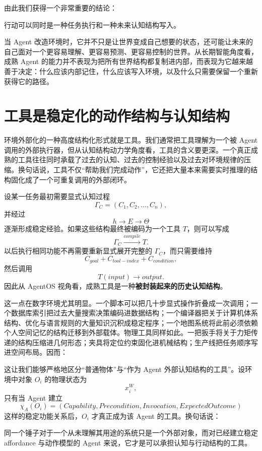 由此我们获得一个非常重要的结论：
\begin{conclusion}
行动可以同时是一种任务执行和一种未来认知结构写入。
\end{conclusion}
当 Agent 改造环境时，它并不只是让世界变成自己想要的状态，还可能让未来的自己面对一个更容易理解、更容易预测、更容易控制的世界。从长期智能角度看，成熟 Agent 的能力并不表现为把所有世界结构都复制进内部，而表现为它越来越善于决定：什么应该内部记住，什么应该写入环境，以及什么只需要保留一个重新获得它的路径。

\section{工具是稳定化的动作结构与认知结构}

环境外部化的一种高度结构化形式就是工具。我们通常把工具理解为一个被 Agent 调用的外部执行器，但从认知结构动力学角度看，工具的含义要更深。一个真正成熟的工具往往同时承载了过去的认知、过去的控制经验以及过去对环境规律的压缩。换句话说，工具不仅``帮助我们完成动作''，它还把大量本来需要实时推理的结构固化成了一个可重复调用的外部闭环。

设某一任务最初需要显式认知过程
\[
\Gamma_C
=
(C_1,C_2,\ldots,C_n),
\]
并经过
\[
h
\rightarrow
E
\rightarrow
\Theta
\]
逐渐形成稳定经验。如果这些结构最终被编码为一个工具 $T$，则可以写成
\[
\Gamma_C
\xrightarrow{compile}
T.
\]
以后执行相同功能不再需要重新显式展开完整的 $\Gamma_C$，而只需要维持
\[
C_{goal}
+
C_{tool-index}
+
C_{condition},
\]
然后调用
\[
T(input)\rightarrow output.
\]
因此从 AgentOS 视角看，成熟工具是一种\textbf{被封装起来的历史认知结构}。

这一点在数字环境尤其明显。一个脚本可以把几十步显式操作折叠成一次调用；一个数据库索引把过去大量搜索决策编码进数据结构；一个编译器把关于计算机体系结构、优化与语言规则的大量知识沉积成稳定程序；一个地图系统将此前必须依赖个人空间记忆的结构迁移到外部载体。物理工具同样如此。一把扳手将关于力矩传递的结构压缩进几何形态；夹具将定位约束固化进机械结构；生产线把任务顺序写进空间布局。因而：
\begin{statementbox}
\centering
{}
\end{statementbox}

这让我们能够严格地区分``普通物体''与``作为 Agent 外部认知结构的工具''。设环境中对象 $O_i$ 的物理状态为
\[
x_i^W,
\]
只有当 Agent 建立
\[
\chi_A(O_i)
=
(
Capability,
Precondition,
Invocation,
ExpectedOutcome
)
\]
这样的稳定功能关系后，$O_i$ 才真正成为该 Agent 的工具。换句话说：
\begin{statementbox}
\centering
{}
\end{statementbox}
同一个锤子对于一个从未理解其用途的系统只是一个外部对象，而对已经建立稳定 affordance 与动作模型的 Agent 来说，它才是可以承担认知与行动结构的工具。

